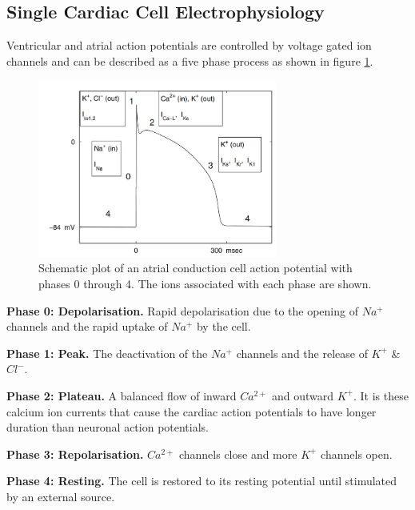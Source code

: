 \subsection{Single Cardiac Cell Electrophysiology} \label{cellelectro}
Ventricular and atrial action potentials are controlled by voltage gated ion channels and can be described as a five phase process as shown in figure \ref{fig2.5}. \par
\begin{figure}
    \centering
    \includegraphics[width=0.7\textwidth]{images/actionpotential.png}
    \caption{Schematic plot of an atrial conduction cell action potential with phases 0 through 4. The ions associated with each phase are shown. \citep{ecg}}
    \label{fig2.5}
\end{figure}
\textbf{Phase 0: Depolarisation.} Rapid depolarisation due to the opening of $Na^+$ channels and the rapid uptake of $Na^+$ by the cell. \par
\textbf{Phase 1: Peak.} The deactivation of the $Na^+$ channels and the release of $K^+$ \& $Cl^-$. \par
\textbf{Phase 2: Plateau.} A balanced flow of inward $Ca^{2+}$ and outward $K^+$. It is these calcium ion currents that cause the cardiac action potentials to have longer duration than neuronal action potentials. \par
\textbf{Phase 3: Repolarisation.} $Ca^{2+}$ channels close and more $K^+$ channels open. \par
\textbf{Phase 4: Resting.} The cell is restored to its resting potential until stimulated by an external source. \par
